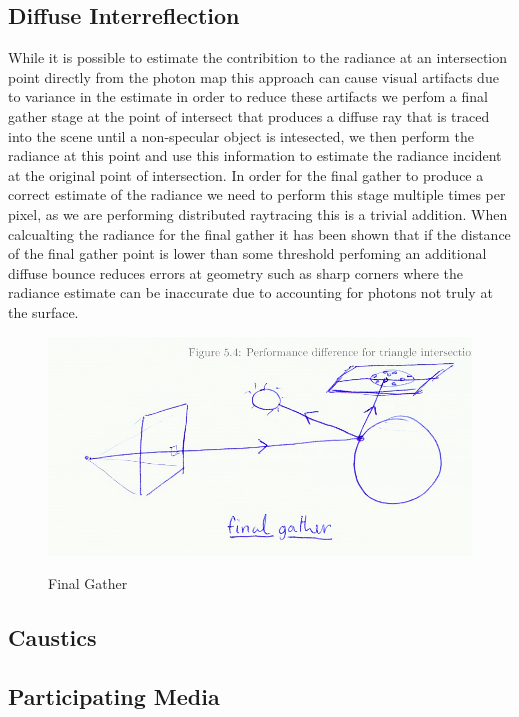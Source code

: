 \subsection{Diffuse Interreflection}
While it is possible to estimate the contribition to the radiance at an intersection point directly from the photon map this
approach can cause visual artifacts due to variance in the estimate in order to reduce these artifacts we perfom a final gather
stage at the point of intersect that produces a diffuse ray that is traced into the scene until a non-specular object is intesected,
we then perform the radiance at this point and use this information to estimate the radiance incident at the original point of intersection.
In order for the final gather to produce a correct estimate of the radiance we need to perform this stage multiple times per pixel, as we
are performing distributed raytracing this is a trivial addition. When calcualting the radiance for the final gather it has been shown 
that if the distance of the final gather point is lower than some threshold perfoming an additional diffuse bounce reduces errors at geometry
such as sharp corners where the radiance estimate can be inaccurate due to accounting for photons not truly at the surface.

\begin{figure}
\centering
\includegraphics[width=\textwidth]{./images/final_gather.png}
\label{fig:final_gather}
\caption{Final Gather}
\end{figure}

\subsection{Caustics}

\subsection{Participating Media}

